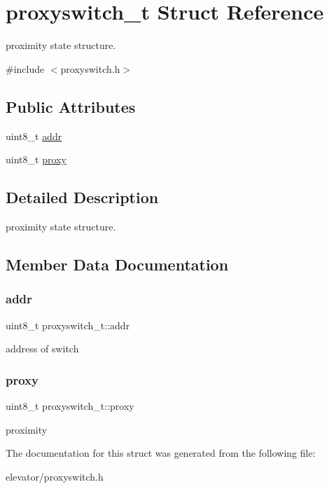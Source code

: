 \hypertarget{structproxyswitch__t}{}\section{proxyswitch\+\_\+t Struct Reference}
\label{structproxyswitch__t}


proximity state structure.  




{\ttfamily \#include $<$proxyswitch.\+h$>$}

\subsection*{Public Attributes}
\begin{DoxyCompactItemize}
\item 
uint8\+\_\+t \hyperlink{structproxyswitch__t_a0faa5c1874e6607fa0d19a07896790b1}{addr}
\item 
uint8\+\_\+t \hyperlink{structproxyswitch__t_a213f28cd0f6e589462cbe6e9cf229f34}{proxy}
\end{DoxyCompactItemize}


\subsection{Detailed Description}
proximity state structure. 

\subsection{Member Data Documentation}
\mbox{\label{structproxyswitch__t_a0faa5c1874e6607fa0d19a07896790b1}} 
\subsubsection{\texorpdfstring{addr}{addr}}
{\footnotesize\ttfamily uint8\+\_\+t proxyswitch\+\_\+t\+::addr}

address of switch \mbox{\label{structproxyswitch__t_a213f28cd0f6e589462cbe6e9cf229f34}} 
\subsubsection{\texorpdfstring{proxy}{proxy}}
{\footnotesize\ttfamily uint8\+\_\+t proxyswitch\+\_\+t\+::proxy}

proximity 

The documentation for this struct was generated from the following file\+:\begin{DoxyCompactItemize}
\item 
elevator/proxyswitch.\+h\end{DoxyCompactItemize}
